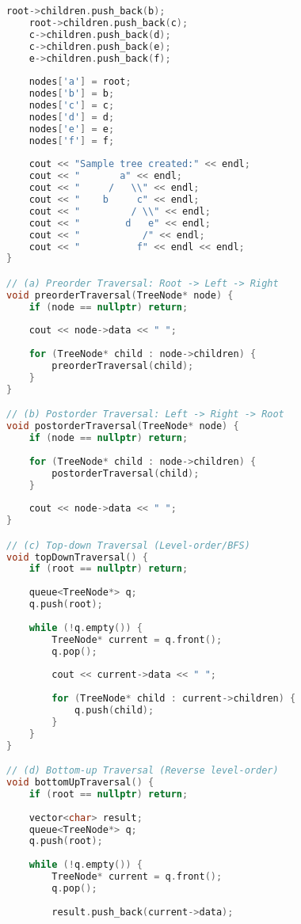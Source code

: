 \documentclass[12pt]{article}
\begin{document}
\begin{lstlisting}[language=C++, caption=Chương trình duyệt cây C++]
    root->children.push_back(b);
    root->children.push_back(c);
    c->children.push_back(d);
    c->children.push_back(e);
    e->children.push_back(f);
    
    nodes['a'] = root;
    nodes['b'] = b;
    nodes['c'] = c;
    nodes['d'] = d;
    nodes['e'] = e;
    nodes['f'] = f;
    
    cout << "Sample tree created:" << endl;
    cout << "       a" << endl;
    cout << "     /   \\" << endl;
    cout << "    b     c" << endl;
    cout << "         / \\" << endl;
    cout << "        d   e" << endl;
    cout << "           /" << endl;
    cout << "          f" << endl << endl;
}

// (a) Preorder Traversal: Root -> Left -> Right
void preorderTraversal(TreeNode* node) {
    if (node == nullptr) return;
    
    cout << node->data << " ";
    
    for (TreeNode* child : node->children) {
        preorderTraversal(child);
    }
}

// (b) Postorder Traversal: Left -> Right -> Root
void postorderTraversal(TreeNode* node) {
    if (node == nullptr) return;
    
    for (TreeNode* child : node->children) {
        postorderTraversal(child);
    }
    
    cout << node->data << " ";
}

// (c) Top-down Traversal (Level-order/BFS)
void topDownTraversal() {
    if (root == nullptr) return;
    
    queue<TreeNode*> q;
    q.push(root);
    
    while (!q.empty()) {
        TreeNode* current = q.front();
        q.pop();
        
        cout << current->data << " ";
        
        for (TreeNode* child : current->children) {
            q.push(child);
        }
    }
}

// (d) Bottom-up Traversal (Reverse level-order)
void bottomUpTraversal() {
    if (root == nullptr) return;
    
    vector<char> result;
    queue<TreeNode*> q;
    q.push(root);
    
    while (!q.empty()) {
        TreeNode* current = q.front();
        q.pop();
        
        result.push_back(current->data);
        

\end{lstlisting}
\end{document}
